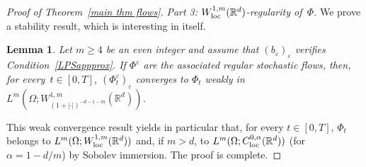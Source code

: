 \documentclass[a4paper,10pt]{article}
\newtheorem{lemma}[theorem]{Lemma}
\newcommand\1{\mathbbm{1}}
\newcommand{\eps}{\varepsilon}
\newcommand\loc{{\rm loc}}
\numberwithin{equation}{section}
\begin{document}
\begin{proof}[Proof of Theorem~\ref{main thm flows}]
\emph{Part 3: $W^{1,m}_{\loc}(\mathbb{R}^d)$-regularity of~$\Phi$.} We prove a stability result, which is interesting in itself.

\begin{lemma}\label{stability}
Let $m \geq 4$ be an even integer and assume that $(b_\eps)_\eps$ verifies Condition~\ref{LPSappprox}. If $\Phi^\eps$ are the associated regular stochastic flows, then, for every~$t \in [0,T]$, $(\Phi^\eps_t)_\eps$ converges to $\Phi_t$ weakly in $L^m(\Omega;W^{1,m}_{(1+|\cdot|)^{-d-1-m}}(\mathbb{R}^d))$.
\end{lemma}

This weak convergence result yields in particular that, for every $t \in [0,T]$, $\Phi_t$ belongs to $L^m(\Omega;W^{1,m}_{\loc}(\mathbb{R}^d))$ and, if $m>d$, to $L^m(\Omega;C^{0,\alpha}_{\loc}(\mathbb{R}^d))$ (for $\alpha=1-d/m$) by Sobolev immersion. The proof is complete.
\end{proof}
\end{document}
